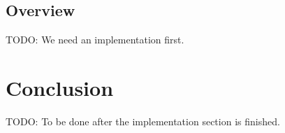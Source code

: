 \documentclass[conference, 11pt]{sty/IEEEtran}
\begin{document}
\subsection{Overview}
\label{ssec:overview}

TODO: We need an implementation first.

\section{Conclusion}
\label{sec:conclusion}

TODO: To be done after the implementation section is finished.



\end{document}
